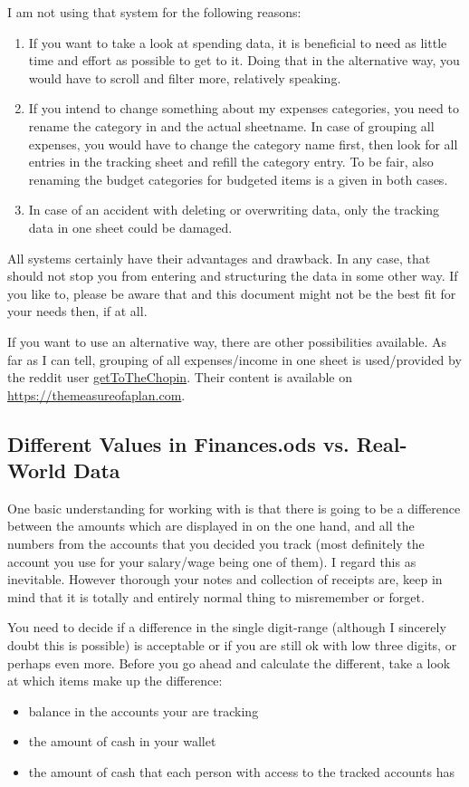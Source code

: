 I am not using that system for the following reasons:
\begin{enumerate}
	\item If you want to take a look at spending data, it is beneficial to need as little time and effort as possible to get to it.
	Doing that in the alternative way, you would have to scroll and filter more, relatively speaking.
	\item If you intend to change something about my expenses categories, you need to rename the category in  and the actual sheetname.
	In case of grouping all expenses, you would have to change the category name first, then look for all entries in the tracking sheet and refill the category entry.
	To be fair, also renaming the budget categories for budgeted items is a given in both cases.
	\item In case of an accident with deleting or overwriting data, only the tracking data in one sheet could be damaged.
\end{enumerate}
All systems certainly have their advantages and drawback.
In any case, that should not stop you from entering and structuring the data in some other way.
If you like to, please be aware that \tfn and this document might not be the best fit for your needs then, if at all.

If you want to use an alternative way, there are other possibilities available.
As far as I can tell, grouping of all expenses/income in one sheet is used/provided by the reddit user \href{https://www.reddit.com/user/getToTheChopin/}{getToTheChopin}.
Their content is available on \url{https://themeasureofaplan.com}.

\subsection{Different Values in Finances.ods vs. Real-World Data}
\label{subsec:different-values-finances.ods-vs-real-world}

One basic understanding for working with \tfn is that there is going to be a difference between the amounts which are displayed in \tfn on the one hand, and all the numbers from the accounts that you decided you track (most definitely the account you use for your salary/wage being one of them).
I regard this as inevitable.
However thorough your notes and collection of receipts are, keep in mind that it is totally and entirely normal thing to misremember or forget.

You need to decide if a difference in the single digit-range (although I sincerely doubt this is possible) is acceptable or if you are still ok with low three digits, or perhaps even more.
Before you go ahead and calculate the different, take a look at which items make up the difference:
\begin{itemize}
	\item balance in the accounts your are tracking
	\item the amount of cash in your wallet
	\item the amount of cash that each person with access to the tracked accounts has
\end{itemize}